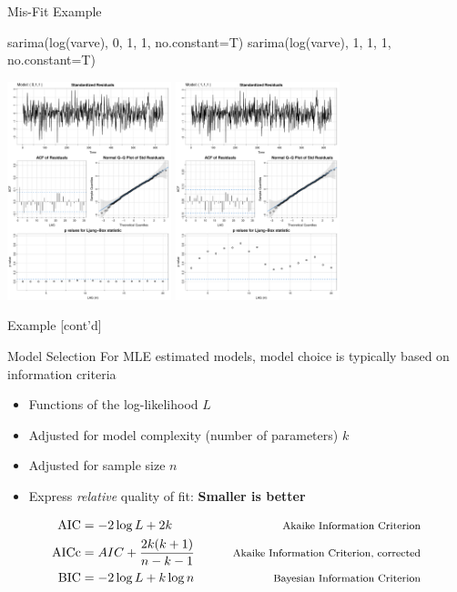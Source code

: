 \documentclass[ignorenonframetext,xcolor=x11names]{beamer}
\begin{document}
\begin{frame}[fragile]{Mis-Fit Example}
\begin{Rcode}
sarima(log(varve), 0, 1, 1, no.constant=T)
sarima(log(varve), 1, 1, 1, no.constant=T)
\end{Rcode}
\begin{center}
\includegraphics[height=2.5in]{figure26.pdf}
\includegraphics[height=2.5in]{figure27.pdf}
\end{center}
\end{frame}

\begin{frame}[fragile]{Example \small [cont'd]}
\begin{block}{Model Selection}
For MLE estimated models, model choice is typically based on information criteria
\begin{itemize}
   \item Functions of the log-likelihood $L$
   \item Adjusted for model complexity (number of parameters) $k$
   \item Adjusted for sample size $n$
   \item Express \emph{relative} quality of fit: \textbf{Smaller is better}
\end{itemize}
\begin{align*}
\operatorname{AIC} &= -2 \log L + 2k  &\qquad \text{\footnotesize Akaike Information Criterion}\\
\operatorname{AICc} &= AIC + \frac{2k(k+1)}{n-k-1} &\qquad \text{\footnotesize Akaike Information Criterion, corrected}\\
\operatorname{BIC} &= -2 \log L + k \log n &\qquad \text{\footnotesize Bayesian Information Criterion}
\end{align*}
\end{block}
\end{frame}
\end{document}
